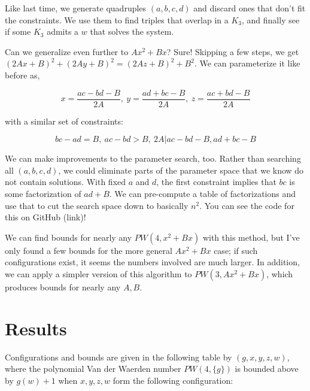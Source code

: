 \documentclass[a4paper]{amsproc}
\theoremstyle{plain}
\begin{document}
Like last time, we generate quadruples $(a,b,c,d)$ and discard ones that don't fit the constraints.
We use them to find triples that overlap in a $K_3$, and finally see if some $K_3$ admits a $w$ that solves the system.

Can we generalize even further to $Ax^2+Bx$? Sure!
Skipping a few steps, we get $(2Ax+B)^2 + (2Ay+B)^2 = (2Az+B)^2 + B^2$.
We can parameterize it like before as,

$$x = \frac{ac-bd-B}{2A},\ y = \frac{ad+bc-B}{2A},\ z = \frac{ac+bd-B}{2A}$$

with a similar set of constraints:

$$bc-ad=B,\ ac-bd> B,\ 2A\vert ac-bd-B, ad+bc-B$$

We can make improvements to the parameter search, too.
Rather than searching all $(a,b,c,d)$, we could eliminate parts of the parameter space that we know do not contain solutions.
With fixed $a$ and $d$, the first constraint implies that $bc$ is some factorization of $ad + B$.
We can pre-compute a table of factorizations and use that to cut the search space down to basically $n^2$.
You can see the code for this on GitHub (link)!

We can find bounds for nearly any $PW(4,x^2+Bx)$ with this method,
but I've only found a few bounds for the more general $Ax^2+Bx$ case;
if such configurations exist, it seems the numbers involved are much larger.
In addition, we can apply a simpler version of this algorithm to $PW(3,Ax^2+Bx)$,
which produces bounds for nearly any $A, B$.

\section{Results}

Configurations and bounds are given in the following table by $(g,x,y,z,w)$, where the polynomial Van der Waerden number
$PW(4, \{g\})$ is bounded above by $g(w)+1$ when $x,y,z,w$ form the following configuration:
\end{document}
